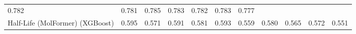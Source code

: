 \documentclass[
  10pt,
]{article}
\begin{document}
\begin{longtable}[]{@{}lllllllllll@{}}
\begin{minipage}[t]{0.07\columnwidth}
0.782\strut
\end{minipage} & \begin{minipage}[t]{0.07\columnwidth}\raggedright
0.781\strut
\end{minipage} & \begin{minipage}[t]{0.07\columnwidth}\raggedright
0.785\strut
\end{minipage} & \begin{minipage}[t]{0.07\columnwidth}\raggedright
0.783\strut
\end{minipage} & \begin{minipage}[t]{0.07\columnwidth}\raggedright
0.782\strut
\end{minipage} & \begin{minipage}[t]{0.07\columnwidth}\raggedright
0.783\strut
\end{minipage} & \begin{minipage}[t]{0.07\columnwidth}\raggedright
0.777\strut
\end{minipage}\tabularnewline
\begin{minipage}[t]{0.07\columnwidth}\raggedright
Half-Life (MolFormer) (XGBoost)\strut
\end{minipage} & \begin{minipage}[t]{0.07\columnwidth}\raggedright
0.595\strut
\end{minipage} & \begin{minipage}[t]{0.07\columnwidth}\raggedright
0.571\strut
\end{minipage} & \begin{minipage}[t]{0.07\columnwidth}\raggedright
0.591\strut
\end{minipage} & \begin{minipage}[t]{0.07\columnwidth}\raggedright
0.581\strut
\end{minipage} & \begin{minipage}[t]{0.07\columnwidth}\raggedright
0.593\strut
\end{minipage} & \begin{minipage}[t]{0.07\columnwidth}\raggedright
0.559\strut
\end{minipage} & \begin{minipage}[t]{0.07\columnwidth}\raggedright
0.580\strut
\end{minipage} & \begin{minipage}[t]{0.07\columnwidth}\raggedright
0.565\strut
\end{minipage} & \begin{minipage}[t]{0.07\columnwidth}\raggedright
0.572\strut
\end{minipage} & \begin{minipage}[t]{0.07\columnwidth}\raggedright
0.551\strut
\end{minipage}\tabularnewline
\bottomrule
\end{longtable}
\end{document}
